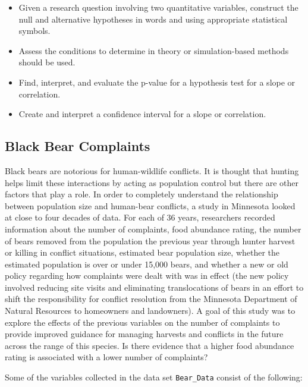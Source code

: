 \documentclass[
]{report}
\begin{document}
\begin{itemize}
\item
  Given a research question involving two quantitative variables, construct the null and alternative hypotheses
  in words and using appropriate statistical symbols.
\item
  Assess the conditions to determine in theory or simulation-based methods should be used.
\item
  Find, interpret, and evaluate the p-value for a hypothesis test for a slope or correlation.
\item
  Create and interpret a confidence interval for a slope or correlation.
\end{itemize}

\hypertarget{black-bear-complaints}{%
\subsection{Black Bear Complaints}\label{black-bear-complaints}}

Black bears are notorious for human-wildlife conflicts. It is thought that hunting helps limit these interactions by acting as population control but there are other factors that play a role. In order to completely understand the relationship between population size and human-bear conflicts, a study in Minnesota looked at close to four decades of data. For each of 36 years, researchers recorded information about the number of complaints, food abundance rating, the number of bears removed from the population the previous year through hunter harvest or killing in conflict situations, estimated bear population size, whether the estimated population is over or under 15,000 bears, and whether a new or old policy regarding how complaints were dealt with was in effect (the new policy involved reducing site visits and eliminating translocations of bears in an effort to shift the responsibility for conflict resolution from the Minnesota Department of Natural Resources to homeowners and landowners). A goal of this study was to explore the effects of the previous variables on the number of complaints to provide improved guidance for managing harvests and conflicts in the future across the range of this species. Is there evidence that a higher food abundance rating is associated with a lower number of complaints?

Some of the variables collected in the data set \texttt{Bear\_Data} consist of the following:
\end{document}
